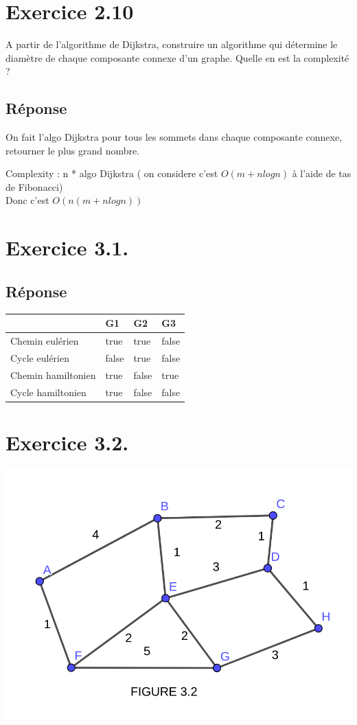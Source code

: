 \documentclass[12pt]{fphw}
\begin{document}
\section*{Exercice 2.10}
\begin{problem}
A partir de l’algorithme de Dijkstra, construire un algorithme qui
détermine le diamètre de chaque composante connexe d’un graphe. Quelle en est la
complexité ?
\end{problem}
\subsection*{Réponse}

On fait l'algo Dijkstra pour tous les sommets  dans chaque composante connexe, retourner le plus grand nombre.

Complexity : n * algo Dijkstra ( on considere c'est $O(m + n log n)$  à l’aide de tas de Fibonacci) \\

Donc c'est $ O(n(m+n log n))$

\section*{Exercice 3.1.}
\subsection*{Réponse}
\begin{center}
	\begin{tabular}{l l l l}
		\toprule
		\textit{} & G1 & G2 & G3 \\
		\midrule
		Chemin eulérien & true & true & false\\
		Cycle eulérien & false & true & false\\
		Chemin hamiltonien & true & false & true\\
		Cycle hamiltonien & true & false & false\\
		\bottomrule
	\end{tabular}
\end{center}

\section*{Exercice 3.2.}

\begin{center}
	\includegraphics[width=0.5\columnwidth]{Figure3.2.png} %
\end{center}
\end{document}
